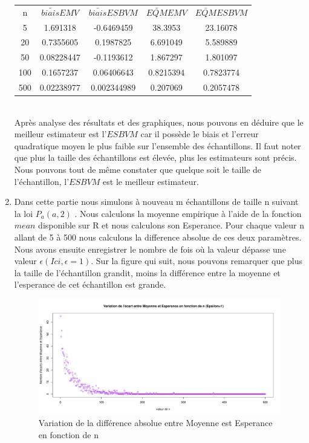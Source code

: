 \documentclass[12pt]{article}
\begin{document}
\begin{enumerate}
\begin{center}
\begin{tabular}{ *{5}{c|} }
   n & $\bar{biais} EMV$ & $\bar{biais} ESBVM$ &  $\bar{EQM} EMV$ & $\bar{EQM} ESBVM $\\
   5 & 1.691318 & -0.6469459 & 38.3953  &  23.16078  \\
   20 & 0.7355605  & 0.1987825  &   6.691049  & 5.589889\\
   50 & 0.08228447  & -0.1193612  &  1.867297 &  1.801097  \\
   100 & 0.1657237  & 0.06406643 & 0.8215394 & 0.7823774   \\
   500 & 0.02238977  & 0.002344989 & 0.207069  & 0.2057478   \\
 \end{tabular}
\end{center}
~~\\Apr\`{e}s analyse des r\'{e}sultats et des graphiques, nous pouvons en d\'{e}duire que le meilleur estimateur est l'$ESBVM$ car il poss\`{e}de  le biais et l'erreur quadratique moyen le plus faible sur l'ensemble des \'{e}chantillons. Il faut noter que plus la taille des \'{e}chantillons est \'{e}lev\'{e}e, plus les estimateurs sont pr\'{e}cis. Nous pouvons tout de m\^{e}me constater que quelque soit le taille de l'\'{e}chantillon, l'$ESBVM$ est le meilleur estimateur.
\\
\item
Dans cette partie nous simulons \`{a} nouveau m \'{e}chantillons de taille n suivant la loi $P_a(a,2)$ . Nous calculons la moyenne empirique \`{a}  l'aide de la fonction $mean$ disponible sur R et nous calculons son Esperance. Pour chaque valeur n allant de 5 \`{a}  500 nous calculons la difference absolue de ces deux param\`{e}tres. Nous avons ensuite enregistrer le nombre de fois o\`{u} la valeur d\'{e}passe une valeur $\epsilon (Ici, \epsilon = 1 )$. Sur la figure qui suit, nous pouvons remarquer que plus la taille de  l'\'{e}chantillon grandit, moins la diff\'{e}rence entre la moyenne et l'esperance de cet \'{e}chantillon est grande.

\begin{figure}[H]
\label{graphe2}
\centering
\includegraphics[width=1.0\textwidth]{figures/GraphP2Q4.pdf}
\caption{Variation de la diff\'{e}rence absolue entre Moyenne est Esperance en fonction de n }
\end{figure}



\end{enumerate}
\end{document}
